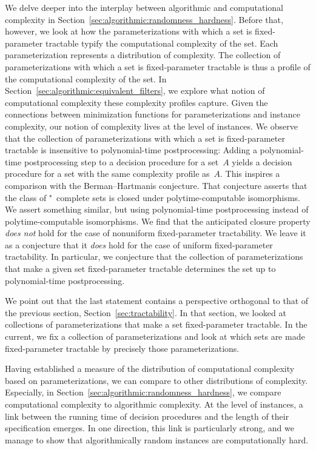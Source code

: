 We delve deeper into the interplay between algorithmic and computational complexity in Section~\ref{sec:algorithmic:randomness_hardness}.
Before that, however, we look at how the parameterizations with which a set is fixed-parameter tractable typify the computational complexity of the set.
Each parameterization represents a distribution of complexity.
The collection of parameterizations with which a set is fixed-parameter tractable is thus a profile of the computational complexity of the set.
In Section~\ref{sec:algorithmic:equivalent_filters}, we explore what notion of computational complexity these complexity profiles capture.
Given the connections between minimization functions for parameterizations and instance complexity, our notion of complexity lives at the level of instances.
We observe that the collection of parameterizations with which a set is fixed-parameter tractable is insensitive to polynomial-time postprocessing:
Adding a polynomial-time postprocessing step to a decision procedure for a set~$A$ yields a decision procedure for a set with the same complexity profile as~$A$.
This inspires a comparison with the Berman--Hartmanis conjecture.
That conjecture asserts that the class of "~complete sets is closed under polytime-computable isomorphisms.
We assert something similar, but using polynomial-time postprocessing instead of polytime-computable isomorphisms.
We find that the anticipated closure property \emph{does not} hold for the case of nonuniform fixed-parameter tractability.
We leave it as a conjecture that it \emph{does} hold for the case of uniform fixed-parameter tractability.
In particular, we conjecture that the collection of parameterizations that make a given set fixed-parameter tractable determines the set up to polynomial-time postprocessing.

We point out that the last statement contains a perspective orthogonal to that of the previous section, Section~\ref{sec:tractability}.
In that section, we looked at collections of parameterizations that make a set fixed-parameter tractable.
In the current, we fix a collection of parameterizations and look at which sets are made fixed-parameter tractable by precisely those parameterizations.

Having established a measure of the distribution of computational complexity based on parameterizations, we can compare to other distributions of complexity.
Especially, in Section~\ref{sec:algorithmic:randomness_hardness}, we compare computational complexity to algorithmic complexity.
At the level of instances, a link between the running time of decision procedures and the length of their specification emerges.
In one direction, this link is particularly strong, and we manage to show that algorithmically random instances are computationally hard.

